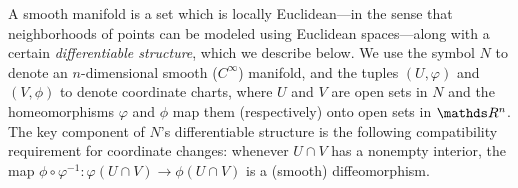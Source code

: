 





A smooth manifold is a set which is locally Euclidean---in the sense that neighborhoods of points can be modeled using Euclidean spaces---along with a certain \textit{differentiable structure}, which we describe below.
We use the symbol $N$ to denote an $n$-dimensional smooth ($C^{\infty}$) manifold, and the tuples $(U, \varphi)$ and $(V, \phi)$ to denote coordinate charts, where $U$ and $V$ are open sets in $N$ and the homeomorphisms $\varphi$ and $\phi$ map them (respectively) onto open sets in $\R^n$. The key component of $N$'s differentiable structure is the following compatibility requirement for coordinate changes: whenever $U \cap V$ has a nonempty interior, the map $\phi\circ\varphi^{-1}: \varphi(U\cap V) \rightarrow \phi(U\cap V)$ is a (smooth) diffeomorphism. %

